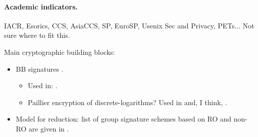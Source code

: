\paragraph{Academic indicators.}
IACR, Esorics, CCS, AsiaCCS, SP, EuroSP, Usenix Sec and Privacy, PETs... Not
sure where to fit this.

Main cryptographic building blocks:

\begin{itemize}
\item BB signatures \cite{bb04}.
  \begin{itemize}
  \item Used in: \cite{ky05}.
  \item Paillier encryption of discrete-logarithms? Used in \cite{ky05} and,
    I think, \cite{gl19}.    
  \end{itemize}
\item Model for reduction: list of group signature schemes based on RO and
  non-RO are given in \cite{bcc+16}.
\end{itemize}
